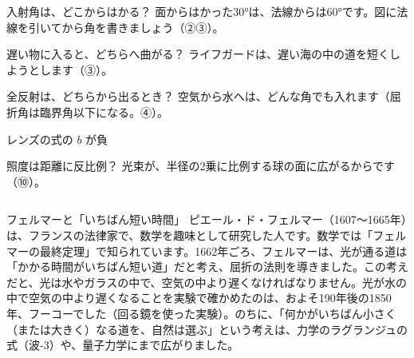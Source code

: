 \begin{tsumazuki}{入射角は、どこからはかる？}
面からはかった\ang{30}は、法線からは\ang{60}です。図に法線を引いてから角を書きましょう（②③）。
\end{tsumazuki}

\begin{tsumazuki}{遅い物に入ると、どちらへ曲がる？}
ライフガードは、遅い海の中の道を短くしようとします（③）。
\end{tsumazuki}

\begin{tsumazuki}{全反射は、どちらから出るとき？}
空気から水へは、どんな角でも入れます（屈折角は臨界角以下になる。④）。
\end{tsumazuki}

\begin{tsumazuki}{レンズの式の $b$ が負}
\end{tsumazuki}

\begin{tsumazuki}{照度は距離に反比例？}
光束が、半径の2乗に比例する球の面に広がるからです（⑩）。
\end{tsumazuki}

\begin{column}{フェルマーと「いちばん短い時間」}
ピエール・ド・フェルマー（1607〜1665年）は、フランスの法律家で、数学を趣味として研究した人です。数学では「フェルマーの最終定理」で知られています。1662年ごろ、フェルマーは、光が通る道は「かかる時間がいちばん短い道」だと考え、屈折の法則を導きました。この考えだと、光は水やガラスの中で、空気の中より遅くなければなりません。光が水の中で空気の中より遅くなることを実験で確かめたのは、およそ190年後の1850年、フーコーでした（回る鏡を使った実験）。のちに、「何かがいちばん小さく（または大きく）なる道を、自然は選ぶ」という考えは、力学のラグランジュの式（波-3）や、量子力学にまで広がりました。
\end{column}

